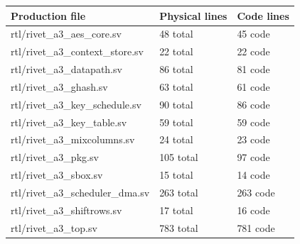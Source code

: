 \documentclass[11pt,a4paper]{article}
\begin{document}
{\small\renewcommand{\arraystretch}{1.18}\begin{longtable}{@{}L{0.55\textwidth}|L{0.18\textwidth}|L{0.18\textwidth}@{}}\toprule

\textbf{Production file} & \textbf{Physical lines} & \textbf{Code lines}\\\midrule\endhead

rtl/\allowbreak{}rivet\_\allowbreak{}a3\_\allowbreak{}aes\_\allowbreak{}core.sv & 48 total & 45 code\\[2pt]\hline

rtl/\allowbreak{}rivet\_\allowbreak{}a3\_\allowbreak{}context\_\allowbreak{}store.sv & 22 total & 22 code\\[2pt]\hline

rtl/\allowbreak{}rivet\_\allowbreak{}a3\_\allowbreak{}datapath.sv & 86 total & 81 code\\[2pt]\hline

rtl/\allowbreak{}rivet\_\allowbreak{}a3\_\allowbreak{}ghash.sv & 63 total & 61 code\\[2pt]\hline

rtl/\allowbreak{}rivet\_\allowbreak{}a3\_\allowbreak{}key\_\allowbreak{}schedule.sv & 90 total & 86 code\\[2pt]\hline

rtl/\allowbreak{}rivet\_\allowbreak{}a3\_\allowbreak{}key\_\allowbreak{}table.sv & 59 total & 59 code\\[2pt]\hline

rtl/\allowbreak{}rivet\_\allowbreak{}a3\_\allowbreak{}mixcolumns.sv & 24 total & 23 code\\[2pt]\hline

rtl/\allowbreak{}rivet\_\allowbreak{}a3\_\allowbreak{}pkg.sv & 105 total & 97 code\\[2pt]\hline

rtl/\allowbreak{}rivet\_\allowbreak{}a3\_\allowbreak{}sbox.sv & 15 total & 14 code\\[2pt]\hline

rtl/\allowbreak{}rivet\_\allowbreak{}a3\_\allowbreak{}scheduler\_\allowbreak{}dma.sv & 263 total & 263 code\\[2pt]\hline

rtl/\allowbreak{}rivet\_\allowbreak{}a3\_\allowbreak{}shiftrows.sv & 17 total & 16 code\\[2pt]\hline

rtl/\allowbreak{}rivet\_\allowbreak{}a3\_\allowbreak{}top.sv & 783 total & 781 code\\[2pt]\hline

\bottomrule\end{longtable}}
\end{document}

